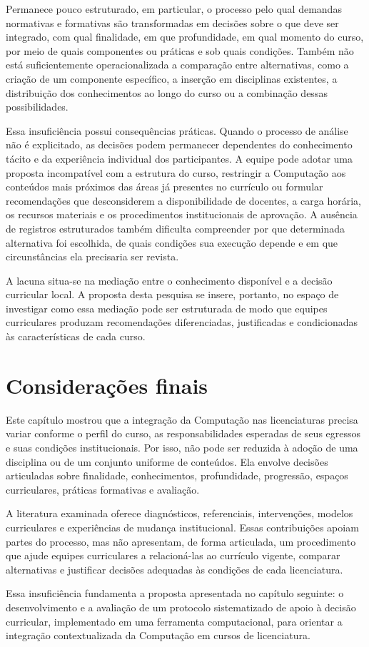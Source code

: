 Permanece pouco estruturado, em particular, o processo pelo qual demandas normativas e formativas são transformadas em decisões sobre o que deve ser integrado, com qual finalidade, em que profundidade, em qual momento do curso, por meio de quais componentes ou práticas e sob quais condições. Também não está suficientemente operacionalizada a comparação entre alternativas, como a criação de um componente específico, a inserção em disciplinas existentes, a distribuição dos conhecimentos ao longo do curso ou a combinação dessas possibilidades.

Essa insuficiência possui consequências práticas. Quando o processo de análise não é explicitado, as decisões podem permanecer dependentes do conhecimento tácito e da experiência individual dos participantes. A equipe pode adotar uma proposta incompatível com a estrutura do curso, restringir a Computação aos conteúdos mais próximos das áreas já presentes no currículo ou formular recomendações que desconsiderem a disponibilidade de docentes, a carga horária, os recursos materiais e os procedimentos institucionais de aprovação. A ausência de registros estruturados também dificulta compreender por que determinada alternativa foi escolhida, de quais condições sua execução depende e em que circunstâncias ela precisaria ser revista.

A lacuna situa-se na mediação entre o conhecimento disponível e a decisão curricular local. A proposta desta pesquisa se insere, portanto, no espaço de investigar como essa mediação pode ser estruturada de modo que equipes curriculares produzam recomendações diferenciadas, justificadas e condicionadas às características de cada curso.

\section{Considerações finais}
\label{sec:consideracoes-finais-revisao-integracao}

Este capítulo mostrou que a integração da Computação nas licenciaturas precisa variar conforme o perfil do curso, as responsabilidades esperadas de seus egressos e suas condições institucionais. Por isso, não pode ser reduzida à adoção de uma disciplina ou de um conjunto uniforme de conteúdos. Ela envolve decisões articuladas sobre finalidade, conhecimentos, profundidade, progressão, espaços curriculares, práticas formativas e avaliação.

A literatura examinada oferece diagnósticos, referenciais, intervenções, modelos curriculares e experiências de mudança institucional. Essas contribuições apoiam partes do processo, mas não apresentam, de forma articulada, um procedimento que ajude equipes curriculares a relacioná-las ao currículo vigente, comparar alternativas e justificar decisões adequadas às condições de cada licenciatura.

Essa insuficiência fundamenta a proposta apresentada no capítulo seguinte: o desenvolvimento e a avaliação de um protocolo sistematizado de apoio à decisão curricular, implementado em uma ferramenta computacional, para orientar a integração contextualizada da Computação em cursos de licenciatura.